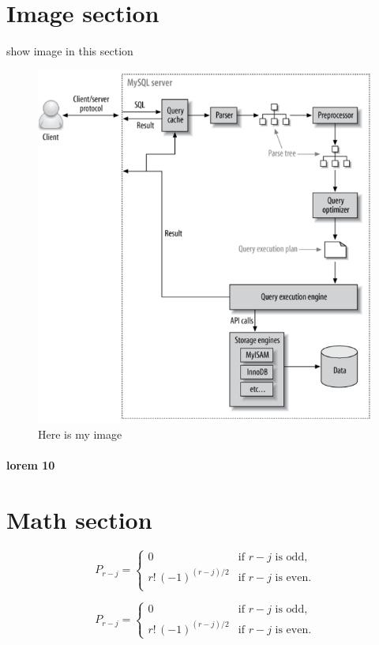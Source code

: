 \documentclass{article}
\begin{document}
{\section{Image section}}
show image in this section
\begin{figure}[h]
  \centering
  \includegraphics[width=0.6\linewidth]{test}
  \caption{Here is my image}
  \label{image-myimage}
  \end{figure}

\paragraph{lorem 10}


{\section{Math section}}


\begin{equation}
  P_{r-j} = 
  \left\{
      \begin{array}{cl}
      0& \text{if $r-j$ is odd},\\
      r!\,(-1)^{(r-j)/2}& \text{if $r-j$ is even}.\\
        \end{array}
  \right.
  \end{equation}

\begin{equation}
  P_{r-j}=\begin{cases}
    0& \text{if $r-j$ is odd},\\
    r!\,(-1)^{(r-j)/2}& \text{if $r-j$ is even}.
    \end{cases} 
  \end{equation}
\end{document}

